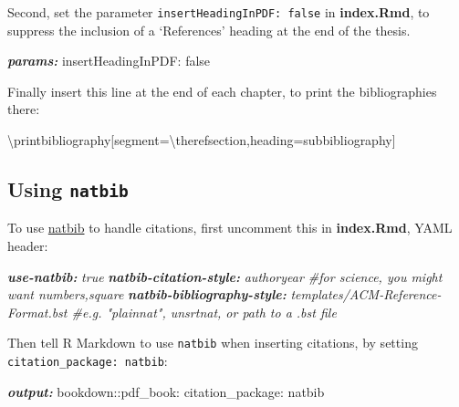 \documentclass[a4paper, nobind]{templates/ociamthesis}
\newenvironment{Shaded}{\begin{snugshade}}{\end{snugshade}}
\newcommand{\AnnotationTok}[1]{\textcolor[rgb]{0.56,0.35,0.01}{\textbf{\textit{#1}}}}
\newcommand{\CommentTok}[1]{\textcolor[rgb]{0.56,0.35,0.01}{\textit{#1}}}
\newcommand{\FunctionTok}[1]{\textcolor[rgb]{0.00,0.00,0.00}{#1}}
\newcommand{\NormalTok}[1]{#1}
\renewenvironment{Shaded}
{
  \vspace{10pt}%
  \begin{snugshade}%
}{%
  \end{snugshade}%
  \vspace{8pt}%
}
\begin{document}
Second, set the parameter \texttt{insertHeadingInPDF:\ false} in \textbf{index.Rmd}, to suppress the inclusion of a `References' heading at the end of the thesis.

\begin{Shaded}
\begin{Highlighting}[]
\AnnotationTok{params:}
\NormalTok{  insertHeadingInPDF: false}
\end{Highlighting}
\end{Shaded}

Finally insert this line at the end of each chapter, to print the bibliographies there:

\begin{Shaded}
\begin{Highlighting}[]
\FunctionTok{\textbackslash{}printbibliography}\NormalTok{[segment=}\FunctionTok{\textbackslash{}therefsection}\NormalTok{,heading=subbibliography]}
\end{Highlighting}
\end{Shaded}

\hypertarget{natbib-custom}{%
\subsection{\texorpdfstring{Using \texttt{natbib}}{Using natbib}}\label{natbib-custom}}

To use \href{https://www.overleaf.com/learn/latex/Bibliography_management_with_natbib}{natbib} to handle citations, first uncomment this in \textbf{index.Rmd}, YAML header:

\begin{Shaded}
\begin{Highlighting}[]
\AnnotationTok{use{-}natbib:}\CommentTok{ true}
\AnnotationTok{natbib{-}citation{-}style:}\CommentTok{ authoryear \#for science, you might want numbers,square}
\AnnotationTok{natbib{-}bibliography{-}style:}\CommentTok{ templates/ACM{-}Reference{-}Format.bst \#e.g. "plainnat", unsrtnat, or path to a .bst file}
\end{Highlighting}
\end{Shaded}

Then tell R Markdown to use \texttt{natbib} when inserting citations, by setting \texttt{citation\_package:\ natbib}:

\begin{Shaded}
\begin{Highlighting}[]
\AnnotationTok{output:}
\NormalTok{  bookdown::pdf\_book:}
\NormalTok{    citation\_package: natbib}
\end{Highlighting}
\end{Shaded}
\end{document}
